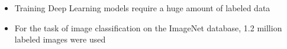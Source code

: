 \documentclass[10pt]{beamer}
\begin{document}
\begin{frame}[fragile]
\begin{itemize}
\item Training \alert{Deep Learning} models require a huge amount of labeled data
\vspace{0.5cm}
\item For the task of image classification on the ImageNet database, 1.2 million
    labeled images were used \cite{imagenet}
\end{itemize}
\end{frame}

%
%
%
%
%
%
%
%
%
%
%
%
%
%
%
%
%
%
\end{document}
